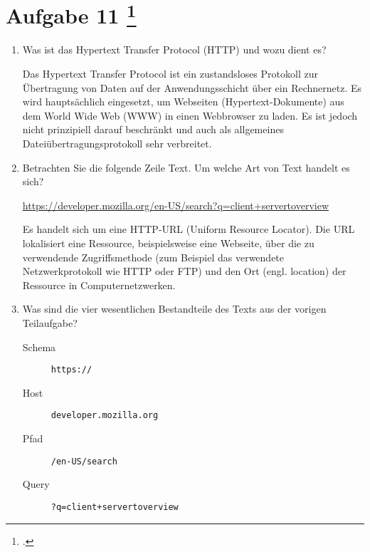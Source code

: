 \documentclass{lehramt-informatik-aufgabe}
\begin{document}
\section{Aufgabe 11
\footcite{66116:2021:03}}

\begin{enumerate}

\item Was ist das Hypertext Transfer Protocol (HTTP) und wozu dient es?

\begin{liAntwort}
Das Hypertext Transfer Protocol ist ein zustandsloses Protokoll zur
Übertragung von Daten auf der Anwendungsschicht über ein Rechnernetz. Es
wird hauptsächlich eingesetzt, um Webseiten (Hypertext-Dokumente) aus
dem World Wide Web (WWW) in einen Webbrowser zu laden. Es ist jedoch
nicht prinzipiell darauf beschränkt und auch als allgemeines
Dateiübertragungsprotokoll sehr verbreitet.
\end{liAntwort}


\item Betrachten Sie die folgende Zeile Text. Um welche Art von Text
handelt es sich?

\url{https://developer.mozilla.org/en-US/search?q=client+servertoverview}

\begin{liAntwort}
Es handelt sich um eine HTTP-URL (Uniform Resource Locator). Die URL
lokalisiert eine Ressource, beispielsweise eine Webseite, über die zu
verwendende Zugriffsmethode (zum Beispiel das verwendete
Netzwerkprotokoll wie HTTP oder FTP) und den Ort (engl. location) der
Ressource in Computernetzwerken.
\end{liAntwort}


\item Was sind die vier wesentlichen Bestandteile des Texts aus der
vorigen Teilaufgabe?

\begin{liAntwort}
\begin{description}
\item[Schema] \texttt{https://}
\item[Host] \texttt{developer.mozilla.org}
\item[Pfad] \texttt{/en-US/search}
\item[Query] \texttt{?q=client+servertoverview}
\end{description}
\end{liAntwort}

\end{enumerate}
\end{document}
